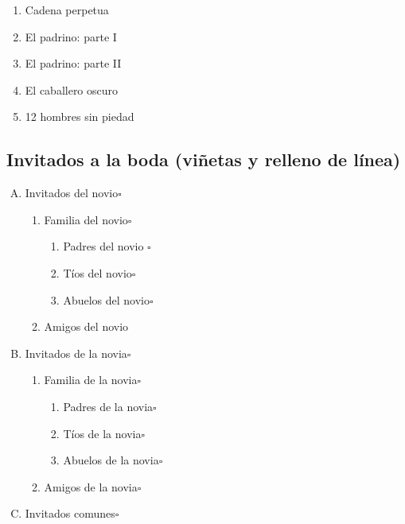\documentclass[a4paper,10pt]{article}
\newcommand{\dotssquare}{\dotfill$\square$}
\theoremstyle{teorema}
\theoremstyle{plano}
\theoremstyle{titulo}
\begin{document}
\begin{enumerate}
\item Cadena perpetua
    \item El padrino: parte I
\item El padrino: parte II
\item El caballero oscuro
\item 12 hombres sin piedad
\end{enumerate}

\subsection{Invitados a la boda (viñetas y relleno de línea)}

\begin{enumerate}[(A)]
    \item Invitados del novio\hfill$\square$
    \begin{enumerate}[label=\fbox{\roman*}]
       \item Familia del novio\dotssquare
       \begin{enumerate}[1.]
           \item Padres del novio \dotssquare
            \item Tíos del novio\dotssquare
            \item Abuelos del novio\dotssquare
       \end{enumerate}
        
        \item Amigos del novio
    \end{enumerate}
    
    \item Invitados de la novia\hfill$\square$
    \begin{enumerate}[label=\fbox{\roman*}]
       \item Familia de la novia\dotssquare
       \begin{enumerate}[1.]
           \item Padres de la novia\dotssquare
            \item Tíos de la novia\dotssquare
            \item Abuelos de la novia\dotssquare
       \end{enumerate}
        
    \item Amigos de la novia\dotssquare
    \end{enumerate}
    \item Invitados comunes\hfill$\square$
\end{enumerate}
\end{document}
